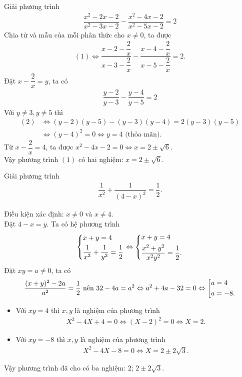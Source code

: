 	\begin{vd}
		Giải phương trình
		\begin{align*}
			\dfrac{x^2-2x-2}{x^2-3x-2} - \dfrac{x^2-4x-2}{x^2-5x-2} = 2 \tag{1}
		\end{align*}
		\loigiai 
		{
			Chia tử và mẫu của mỗi phân thức cho $x \ne 0$, ta được
			\begin{align*}
				(1) \Leftrightarrow \dfrac{x-2-\dfrac{2}{x}}{x-3-\dfrac{2}{x}} - \dfrac{x-4-\dfrac{2}{x}}{x-5-\dfrac{2}{x}} = 2.
			\end{align*}
			Đặt $x-\dfrac{2}{x}=y$, ta có 
			\begin{align*}
				\dfrac{y-2}{y-3} - \dfrac{y-4}{y-5} = 2 \tag{2}
			\end{align*}
			Với $y \ne 3, y \ne 5$ thì 
			\begin{align*}
				(2) &\Leftrightarrow (y-2)(y-5) - (y-3)(y-4) = 2(y-3)(y-5) \\
				&\Leftrightarrow (y-4)^2=0 \Leftrightarrow y=4 \text{ (thỏa mãn)}.
			\end{align*}
			Từ $x - \dfrac{2}{x}=4$, ta được $x^2-4x-2=0 \Leftrightarrow x=2 \pm \sqrt{6}$. \\
			Vậy phương trình $(1)$ có hai nghiệm: $x = 2 \pm \sqrt{6}$.
		}
	\end{vd}
	
	\begin{vd}
		Giải phương trình
		\begin{align*}
			\dfrac{1}{x^2} + \dfrac{1}{(4-x)^2} = \dfrac{1}{2}.
		\end{align*}
		\loigiai 
		{
			Điều kiện xác định: $x \ne 0$ và $x \ne 4$. \\
			Đặt $4-x=y$. Ta có hệ phương trình
			\begin{align*}
				\left\{\begin{aligned}&x+y=4 \\ &\dfrac{1}{x^2} + \dfrac{1}{y^2} = \dfrac{1}{2}\end{aligned}\right. \Leftrightarrow \left\{\begin{aligned}&x+y=4 \\ &\dfrac{x^2+y^2}{x^2y^2} = \dfrac{1}{2}.\end{aligned}\right.
			\end{align*}
			Đặt $xy = a \ne 0$, ta có
			\begin{align*}
				\dfrac{(x+y)^2 - 2a}{a^2} = \dfrac{1}{2} \text{ nên } 32-4a=a^2 \Leftrightarrow a^2+4a-32=0 \Leftrightarrow \left[\begin{aligned}&a=4 \\ &a=-8.\end{aligned}\right.
			\end{align*}
			\begin{itemize}
				\item Với $xy = 4$ thì $x,y$ là nghiệm của phương trình
					\begin{align*}
						X^2-4X+4=0 \Leftrightarrow (X-2)^2 = 0 \Leftrightarrow X = 2.
					\end{align*}
				\item Với $xy=-8$ thì $x,y$ là nghiệm của phương trình
					\begin{align*}
						X^2 - 4X - 8 = 0 \Leftrightarrow X = 2 \pm 2\sqrt{3}.
					\end{align*}
			\end{itemize}
			Vậy phương trình đã cho có ba nghiệm: $2$; $2 \pm 2\sqrt{3}$.
		}
	\end{vd}
	
